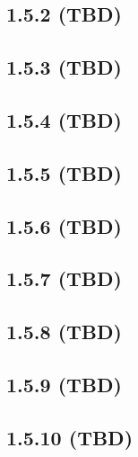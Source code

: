 \documentclass[11pt]{article}
\begin{document}
\subsection*{1.5.2 (TBD)}
\subsection*{1.5.3 (TBD)}
\subsection*{1.5.4 (TBD)}
\subsection*{1.5.5 (TBD)}
\subsection*{1.5.6 (TBD)}
\subsection*{1.5.7 (TBD)}
\subsection*{1.5.8 (TBD)}
\subsection*{1.5.9 (TBD)}
\subsection*{1.5.10 (TBD)}
\end{document}
